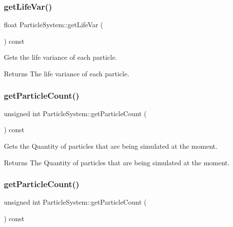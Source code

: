 \subsubsection{\texorpdfstring{get\+Life\+Var()}{getLifeVar()}\hspace{0.1cm}{\footnotesize\ttfamily [2/2]}}
{\footnotesize\ttfamily float Particle\+System\+::get\+Life\+Var (\begin{DoxyParamCaption}{ }\end{DoxyParamCaption}) const\hspace{0.3cm}{\ttfamily [inline]}}

Gets the life variance of each particle.

\begin{DoxyReturn}{Returns}
The life variance of each particle. 
\end{DoxyReturn}
\mbox{\label{classParticleSystem_a730a00168ae2f5df5fe41b0b6681609b}} 
\subsubsection{\texorpdfstring{get\+Particle\+Count()}{getParticleCount()}\hspace{0.1cm}{\footnotesize\ttfamily [1/2]}}
{\footnotesize\ttfamily unsigned int Particle\+System\+::get\+Particle\+Count (\begin{DoxyParamCaption}{ }\end{DoxyParamCaption}) const\hspace{0.3cm}{\ttfamily [inline]}}

Gets the Quantity of particles that are being simulated at the moment.

\begin{DoxyReturn}{Returns}
The Quantity of particles that are being simulated at the moment. 
\end{DoxyReturn}
\mbox{\label{classParticleSystem_a730a00168ae2f5df5fe41b0b6681609b}} 
\subsubsection{\texorpdfstring{get\+Particle\+Count()}{getParticleCount()}\hspace{0.1cm}{\footnotesize\ttfamily [2/2]}}
{\footnotesize\ttfamily unsigned int Particle\+System\+::get\+Particle\+Count (\begin{DoxyParamCaption}{ }\end{DoxyParamCaption}) const\hspace{0.3cm}{\ttfamily [inline]}}

